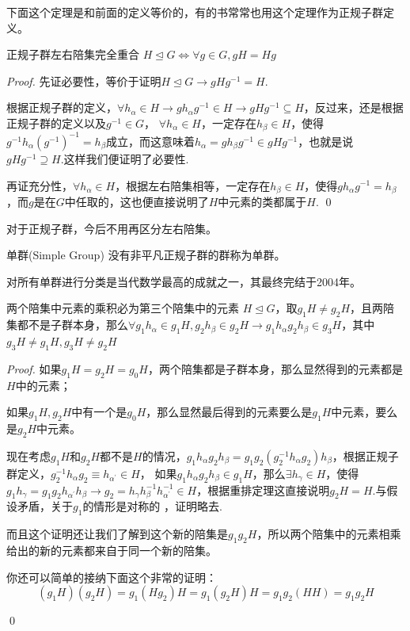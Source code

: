 下面这个定理是和前面的定义等价的，有的书常常也用这个定理作为正规子群定义。
\begin{theorem}{正规子群左右陪集完全重合}
    $H\unlhd G\iff \forall g\in G,gH=Hg$
\end{theorem}
\begin{proof}
    先证必要性，等价于证明$H\unlhd G\rightarrow gHg^{-1}=H$.

    根据正规子群的定义，$\forall h_\alpha\in H\rightarrow gh_\alpha g^{-1}\in H\rightarrow gHg^{-1}\subseteq H$，反过来，还是根据正规子群的定义以及$g^{-1}\in G$，
    $\forall h_\alpha\in H$，一定存在$h_\beta\in H$，使得$g^{-1}h_\alpha (g^{-1})^{-1}=h_\beta$成立，而这意味着$h_\alpha=g h_\beta g^{-1}\in gHg^{-1}$，也就是说$gHg^{-1}\supseteq H$.这样我们便证明了必要性.

    再证充分性，$\forall h_\alpha\in H$，根据左右陪集相等，一定存在$h_\beta\in H$，使得$gh_\alpha g^{-1}=h_\beta$，而$g$是在$G$中任取的，这也便直接说明了$H$中元素的类都属于$H$.
    \qed
\end{proof}
对于正规子群，今后不用再区分左右陪集。
\begin{define}{单群(Simple Group)}
	没有非平凡正规子群的群称为单群。
\end{define}
对所有单群进行分类是当代数学最高的成就之一，其最终完结于2004年。
\begin{theorem}{两个陪集中元素的乘积必为第三个陪集中的元素}
    $H\unlhd G$，取$g_1H\neq g_2H$，且两陪集都不是子群本身，那么$\forall g_1h_\alpha\in g_1H,g_2h_\beta\in g_2H\rightarrow g_1h_\alpha g_2h_\beta\in g_3H$，其中$g_3H\neq g_1H,g_3H\neq g_2H$
\end{theorem}
\begin{proof}
    如果$g_1H=g_2H=g_0H$，两个陪集都是子群本身，那么显然得到的元素都是$H$中的元素；

    如果$g_1H,g_2H$中有一个是$g_0H$，那么显然最后得到的元素要么是$g_1H$中元素，要么是$g_2H$中元素。

    现在考虑$g_1H$和$g_2H$都不是$H$的情况，$g_1h_\alpha g_2 h_\beta=g_1g_2(g_2^{-1}h_\alpha g_2 )h_\beta$，根据正规子群定义，$g_2^{-1}h_\alpha g_2\equiv h_{\alpha^\prime}\in H$，
    如果$g_1h_{\alpha} g_2 h_\beta\in g_1H$，那么$\exists h_\gamma\in H$，使得$g_1h_\gamma=g_1g_2h_{\alpha^\prime} h_\beta\rightarrow g_2=h_\gamma h_\beta^{-1} h_{\alpha^\prime}^{-1}\in H$，根据重排定理这直接说明$g_2 H=H$.与假设矛盾，关于$g_1$的情形是对称的
    ，证明略去. 

    而且这个证明还让我们了解到这个新的陪集是$g_1g_2H$，所以两个陪集中的元素相乘给出的新的元素都来自于同一个新的陪集。
    
    你还可以简单的接纳下面这个非常的证明：\[(g_1H)(g_2H)=g_1(Hg_2)H=g_1(g_2H)H=g_1g_2(HH)=g_1g_2H\]
    
    \qed
\end{proof}
